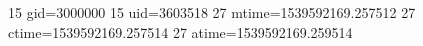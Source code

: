 15 gid=3000000
15 uid=3603518
27 mtime=1539592169.257512
27 ctime=1539592169.257514
27 atime=1539592169.259514
